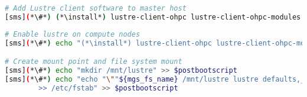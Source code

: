 
\begin{lstlisting}[language=bash,keywords={},upquote=true]
# Add Lustre client software to master host
[sms](*\#*) (*\install*) lustre-client-ohpc lustre-client-ohpc-modules
\end{lstlisting}

\begin{lstlisting}[language=bash,keywords={},upquote=true]
# Enable lustre on compute nodes
[sms](*\#*) echo "(*\install*) lustre-client-ohpc lustre-client-ohpc-modules" >> $postbootscript

# Create mount point and file system mount
[sms](*\#*) echo "mkdir /mnt/lustre" >> $postbootscript
[sms](*\#*) echo "echo "\""${mgs_fs_name} /mnt/lustre lustre defaults,_netdev,localflock,retry=2 0 0"\"" \
        >> /etc/fstab" >> $postbootscript
\end{lstlisting}
